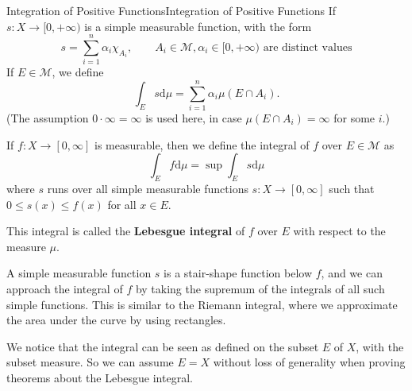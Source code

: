 \documentclass[../main.tex]{subfiles}
\begin{document}
\begin{definition}{Integration of Positive Functions}{Integration of Positive Functions}
	If $s: X \rightarrow [0,+\infty )$ is a simple measurable function, with the form
	\begin{equation*}
		s = \sum_{i=1}^{n} \alpha_i \chi_{A_i}, \qquad A_i\in \mathcal{M}, \alpha_i \in [0,+\infty ) \text{ are distinct values}
	\end{equation*}
	If $E\in \mathcal{M}$, we define
	\begin{equation}
		\int_E s \mathrm{d} \mu = \sum_{i=1}^{n} \alpha_i \mu(E \cap A_i).
	\end{equation}
	(The assumption $0 \cdot \infty =\infty $ is used here, in case $\mu(E \cap A_i) = \infty $ for some $i$.)

	If $f: X \rightarrow [0,\infty ]$ is measurable, then we define the integral of $f$ over $E\in \mathcal{M}$ as
	\begin{equation}
		\int_E f \mathrm{d} \mu = \sup \int_E s \mathrm{d} \mu
	\end{equation}
	where $s$ runs over all simple measurable functions $s: X \rightarrow [0,\infty ]$ such that $0\leq s(x) \leq f(x)$ for all $x\in E$.

	This integral is called the \textbf{Lebesgue integral} of $f$ over $E$ with respect to the measure $\mu$.
\end{definition}

\begin{remark}
	A simple measurable function $s$ is a stair-shape function below $f$, and we can approach the integral of $f$ by taking the supremum of the integrals of all such simple functions. This is similar to the Riemann integral, where we approximate the area under the curve by using rectangles.

	We notice that the integral can be seen as defined on the subset $E$ of $X$, with the subset measure. So we can assume $E = X$ without loss of generality when proving theorems about the Lebesgue integral.
\end{remark}
\end{document}
